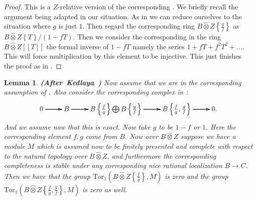 \documentclass[12pt]{amsart}
\newtheorem{lemma}[theorem]{Lemma}
\theoremstyle{definition}
\numberwithin{equation}{section}
\begin{document}
\begin{proof}
This is a $Z$-relative version of the corresponding \cite[Lemma 1.9.3]{Ked2}. We briefly recall the argument being adapted in our situation. As in \cite[Lemma 1.9.3]{Ked2} we can reduce ourselves to the situation where $g$ is just $1$. Then regard the corresponding ring $B\widehat{\otimes}Z\left\{\frac{g}{f}\right\}$ as $B\widehat{\otimes}Z\left\{T\right\}/(1-fT)$. Then we consider the corresponding in the ring $B\widehat{\otimes}Z[[T]]$ the formal inverse of $1-fT$ namely the series $1+fT+f^2T^2+...$. This will force multiplication by this element to be injective. This just finishes the proof as in \cite[Lemma 1.9.3]{Ked2}.
\end{proof}



\begin{lemma} \mbox{\bf{(After Kedlaya \cite[Lemma 1.9.4]{Ked2})}} \label{lemma2.6}
Now assume that we are in the corresponding assumption of \cite[1.7.1]{Ked2}. Also consider the corresponding complex in \cite[1.6.15.1]{Ked2}:
\[
\xymatrix@C+0pc@R+0pc{
0 \ar[r] \ar[r] \ar[r] &B \ar[r] \ar[r] \ar[r] &B\left\{\frac{f}{g}\right\}\bigoplus B\left\{\frac{g}{f}\right\} \ar[r] \ar[r] \ar[r] &B\left\{\frac{f}{g},\frac{g}{f}\right\} \ar[r] \ar[r] \ar[r] &0.
}
\]	
And we assume now that this is exact. Now take $g$ to be $1-f$ or $1$. Here the corresponding element $f,g$ come from $B$. Now over $B\widehat{\otimes}Z$ suppose we have a module $M$ which is assumed now to be finitely presented and complete with respect to the natural topology over $B\widehat{\otimes}Z$, and furthermore the corresponding completeness is stable under any corresponding nice rational localization $B\rightarrow C$. Then we have that the group $\mathrm{Tor}_1(B\widehat{\otimes}Z\left\{\frac{f}{g}\right\},M)$ is zero and the group $\mathrm{Tor}_1(B\widehat{\otimes}Z\left\{\frac{f}{g},\frac{g}{f}\right\},M)$ is zero as well. 	
\end{lemma}
\end{document}
